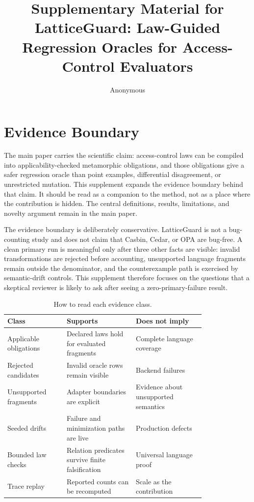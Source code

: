 \documentclass[10pt,conference]{IEEEtran}
\title{Supplementary Material for\\LatticeGuard: Law-Guided Regression Oracles for Access-Control Evaluators}
\author{Anonymous}
\begin{document}
\maketitle

\section{Evidence Boundary}
The main paper carries the scientific claim: access-control laws can be compiled into applicability-checked metamorphic obligations, and those obligations give a safer regression oracle than point examples, differential disagreement, or unrestricted mutation.  This supplement expands the evidence boundary behind that claim.  It should be read as a companion to the method, not as a place where the contribution is hidden.  The central definitions, results, limitations, and novelty argument remain in the main paper.

The evidence boundary is deliberately conservative.  LatticeGuard is not a bug-counting study and does not claim that Casbin, Cedar, or OPA are bug-free.  A clean primary run is meaningful only after three other facts are visible: invalid transformations are rejected before accounting, unsupported language fragments remain outside the denominator, and the counterexample path is exercised by semantic-drift controls.  This supplement therefore focuses on the questions that a skeptical reviewer is likely to ask after seeing a zero-primary-failure result.

\begin{table}[t]
\centering
\caption{How to read each evidence class.}
\label{tab:reading}
\begin{tabular}{p{0.24\linewidth}p{0.28\linewidth}p{0.28\linewidth}}
\toprule
Class & Supports & Does not imply \\
\midrule
Applicable obligations & Declared laws hold for evaluated fragments & Complete language coverage \\
Rejected candidates & Invalid oracle rows remain visible & Backend failures \\
Unsupported fragments & Adapter boundaries are explicit & Evidence about unsupported semantics \\
Seeded drifts & Failure and minimization paths are live & Production defects \\
Bounded law checks & Relation predicates survive finite falsification & Universal language proof \\
Trace replay & Reported counts can be recomputed & Scale as the contribution \\
\bottomrule
\end{tabular}
\end{table}
\end{document}

